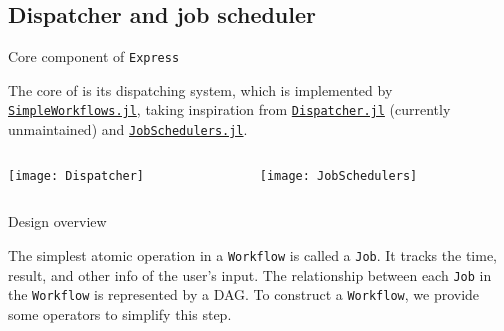 \subsection{Dispatcher and job scheduler}

\begin{frame}{Core component of \texttt{Express}}

    The core of \express{} is its dispatching system,
    which is implemented by
    \href{https://github.com/MineralsCloud/SimpleWorkflows.jl}{\texttt{SimpleWorkflows.jl}},
    taking inspiration from
    \href{https://github.com/invenia/Dispatcher.jl}{\texttt{Dispatcher.jl}}
    (currently unmaintained) and
    \href{https://github.com/cihga39871/JobSchedulers.jl}{\texttt{JobSchedulers.jl}}.

    \begin{columns}[t]
        \begin{column}{0.4\textwidth}
            \begin{center}
                \texttt{[image: Dispatcher]}
            \end{center}
        \end{column}
        \hfill
        \begin{column}{0.4\textwidth}
            \begin{center}
                \texttt{[image: JobSchedulers]}
            \end{center}
        \end{column}
    \end{columns}

\end{frame}

\begin{frame}{Design overview}

    The simplest atomic operation in a \texttt{Workflow} is called a \texttt{Job}.
    It tracks the time, result, and other info of the user's input.
    The relationship between each \texttt{Job} in the \texttt{Workflow} is represented by a
    DAG.
    To construct a \texttt{Workflow}, we provide some operators to simplify this step.

\end{frame}

